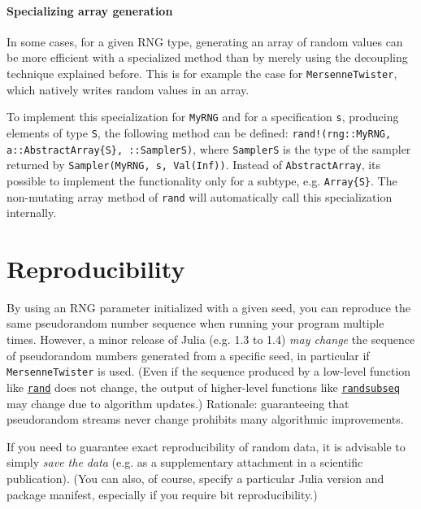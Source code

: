 \hypertarget{9194362945868125985}{}


\subsubsection{Specializing array generation}



In some cases, for a given RNG type, generating an array of random values can be more efficient with a specialized method than by merely using the decoupling technique explained before. This is for example the case for \texttt{MersenneTwister}, which natively writes random values in an array.



To implement this specialization for \texttt{MyRNG} and for a specification \texttt{s}, producing elements of type \texttt{S}, the following method can be defined: \texttt{rand!(rng::MyRNG, a::AbstractArray\{S\}, ::SamplerS)}, where \texttt{SamplerS} is the type of the sampler returned by \texttt{Sampler(MyRNG, s, Val(Inf))}. Instead of \texttt{AbstractArray}, it{\textquotesingle}s possible to implement the functionality only for a subtype, e.g. \texttt{Array\{S\}}. The non-mutating array method of \texttt{rand} will automatically call this specialization internally.





\hypertarget{3655118098996655995}{}


\chapter{Reproducibility}



By using an RNG parameter initialized with a given seed, you can reproduce the same pseudorandom number sequence when running your program multiple times. However, a minor release of Julia (e.g. 1.3 to 1.4) \emph{may change} the sequence of pseudorandom numbers generated from a specific seed, in particular if \texttt{MersenneTwister} is used. (Even if the sequence produced by a low-level function like \hyperlink{7668863842145012694}{\texttt{rand}} does not change, the output of higher-level functions like \hyperlink{10454370655022505544}{\texttt{randsubseq}} may change due to algorithm updates.) Rationale: guaranteeing that pseudorandom streams never change prohibits many algorithmic improvements.



If you need to guarantee exact reproducibility of random data, it is advisable to simply \emph{save the data} (e.g. as a supplementary attachment in a scientific publication). (You can also, of course, specify a particular Julia version and package manifest, especially if you require bit reproducibility.)



